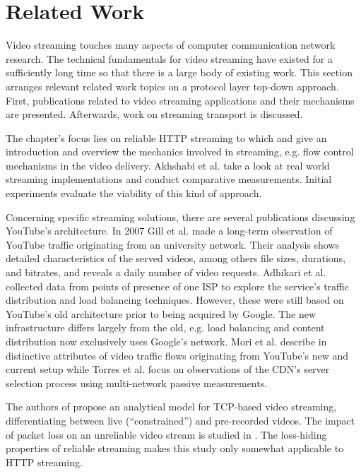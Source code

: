 \section{Related Work}


Video streaming touches many aspects of computer communication network research. The technical fundamentals for video streaming have existed for a sufficiently long time so that there is a large body of existing work. This section arranges relevant related work topics on a protocol layer top-down approach. First, publications related to video streaming applications and their mechanisms are presented. Afterwards, work on streaming transport is discussed.


The chapter's focus lies on reliable \gls{HTTP} streaming to which \cite{watching-video1} and \cite{ma2011mobile} give an introduction and overview the mechanics involved in streaming, e.g. flow control mechanisms in the video delivery. Akhshabi et al. \cite{akhshabi2011experimental} take a look at real world streaming implementations and conduct comparative measurements. Initial experiments evaluate the viability of this kind of approach. 

Concerning specific streaming solutions, there are several publications discussing YouTube's architecture. In 2007 Gill et al. \cite{gill2007youtube} made a long-term observation of YouTube traffic originating from an university network. Their analysis shows detailed characteristics of the served videos, among others file sizes, durations, and bitrates, and reveals a daily number of video requests. Adhikari et al. \cite{adhikari2010youtube} collected data from points of presence of one ISP to explore the service's traffic distribution and load balancing techniques. However, these were still based on YouTube's old architecture prior to being acquired by Google. The new infrastructure differs largely from the old, e.g. load balancing and content distribution now exclusively uses Google's network. Mori et al. describe in \cite{mori2010characterizing} distinctive attributes of video traffic flows originating from YouTube's new and current setup while Torres et al. \cite{torres2011dissecting} focus on observations of the CDN's server selection process using multi-network passive measurements.


The authors of \cite{wang2003model} propose an analytical model for TCP-based video streaming, differentiating between live (``constrained'') and pre-recorded videos. The impact of packet loss on an unreliable video stream is studied in \cite{pv2010loss}. The loss-hiding properties of reliable streaming makes this study only somewhat applicable to \gls{HTTP} streaming.


